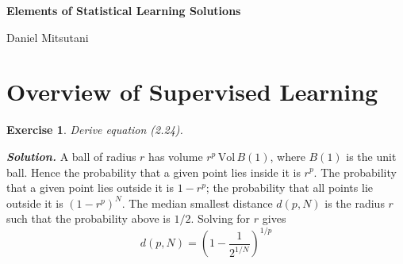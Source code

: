 \documentclass[12pt]{article}
\newtheorem{exercise}{Exercise}[section]
\newenvironment{solution}[1][\it{Solution}]{\textbf{#1. } }{\vspace{.5cm}}
\begin{document}
\begin{center}
\noindent  \textbf{\Large Elements of Statistical Learning Solutions}
\vspace{.2cm}

\noindent 	Daniel Mitsutani
\end{center}
\newpage


\section{Overview of Supervised Learning}
\hrulefill
\vspace{.6cm}
\begin{exercise}
    Derive equation (2.24).
\end{exercise}
\begin{solution}
    A ball of radius $r$ has volume $r^p \, \text{Vol} \,B(1)$, where $B(1)$ is the unit ball. Hence the probability that a given point lies inside it is $r^p$. The probability that a given point lies outside it is $1-r^p$; the probability that all points lie outside it is $(1-r^p)^N$. The median smallest distance $d(p,N)$ is the radius $r$ such that the probability above is $1/2$. Solving for $r$ gives
    $$d(p,N) = \left(1-\frac{1}{2^{1/N}}\right)^{1/p}$$
\end{solution}
\end{document}
